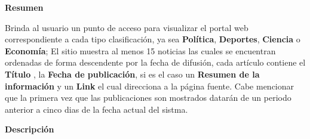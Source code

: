 
\begin{large}
	\textbf{Resumen}\\
\end{large}

Brinda al usuario un punto de acceso para visualizar el portal web correspondiente a cada tipo clasificación, ya sea \textbf{Política}, \textbf{Deportes}, \textbf{Ciencia} o \textbf{Economía}; El sitio muestra al menos 15 noticias las cuales se encuentran ordenadas de forma descendente por la fecha de difusión, cada artículo contiene el \textbf{Título} , la \textbf{Fecha de publicación}, si es el caso un \textbf{Resumen de la información}  y un \textbf{Link} el cual direcciona a la página fuente. Cabe mencionar que la primera vez que las publicaciones son mostrados datarán de un periodo anterior a cinco dias de la fecha actual del sistma.\\

\begin{large}
	\textbf{Descripción}\\
\end{large}

